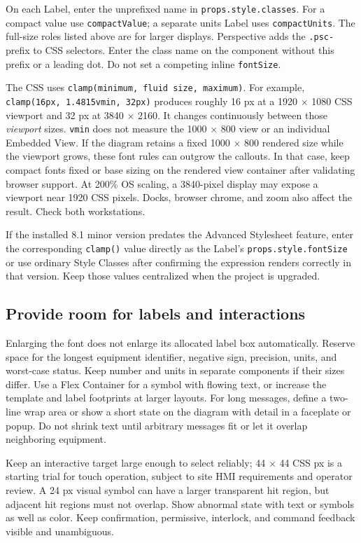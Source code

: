 On each Label, enter the unprefixed name in \texttt{props.style.classes}. For a compact value use \texttt{compactValue}; a separate units Label uses \texttt{compactUnits}. The full-size roles listed above are for larger displays. Perspective adds the \texttt{.psc-} prefix to CSS selectors. Enter the class name on the component without this prefix or a leading dot. Do not set a competing inline \texttt{fontSize}.

The CSS uses \texttt{clamp(minimum, fluid size, maximum)}. For example, \texttt{clamp(16px, 1.4815vmin, 32px)} produces roughly 16 px at a 1920 $\times$ 1080 CSS viewport and 32 px at 3840 $\times$ 2160. It changes continuously between those \emph{viewport} sizes. \texttt{vmin} does not measure the 1000 $\times$ 800 view or an individual Embedded View. If the diagram retains a fixed 1000 $\times$ 800 rendered size while the viewport grows, these font rules can outgrow the callouts. In that case, keep compact fonts fixed or base sizing on the rendered view container after validating browser support. At 200\% OS scaling, a 3840-pixel display may expose a viewport near 1920 CSS pixels. Docks, browser chrome, and zoom also affect the result. Check both workstations.

If the installed 8.1 minor version predates the Advanced Stylesheet feature, enter the corresponding \texttt{clamp()} value directly as the Label's \texttt{props.style.fontSize} or use ordinary Style Classes after confirming the expression renders correctly in that version. Keep those values centralized when the project is upgraded.

\subsection{Provide room for labels and interactions}
Enlarging the font does not enlarge its allocated label box automatically. Reserve space for the longest equipment identifier, negative sign, precision, units, and worst-case status. Keep number and units in separate components if their sizes differ. Use a Flex Container for a symbol with flowing text, or increase the template and label footprints at larger layouts. For long messages, define a two-line wrap area or show a short state on the diagram with detail in a faceplate or popup. Do not shrink text until arbitrary messages fit or let it overlap neighboring equipment.

Keep an interactive target large enough to select reliably; 44 $\times$ 44 CSS px is a starting trial for touch operation, subject to site HMI requirements and operator review. A 24 px visual symbol can have a larger transparent hit region, but adjacent hit regions must not overlap. Show abnormal state with text or symbols as well as color. Keep confirmation, permissive, interlock, and command feedback visible and unambiguous.


